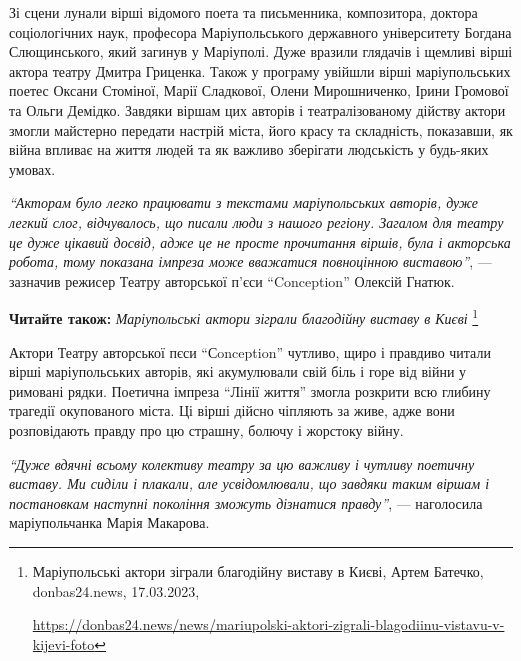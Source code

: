 Зі сцени лунали вірші відомого поета та письменника, композитора, доктора
соціологічних наук, професора Маріупольського державного університету Богдана
Слющинського, який загинув у Маріуполі. Дуже вразили глядачів і щемливі вірші
актора театру Дмитра Гриценка. Також у програму увійшли вірші маріупольських
поетес Оксани Стоміної, Марії Сладкової, Олени Мирошниченко, Ірини Громової та
Ольги Демідко. Завдяки віршам цих авторів і театралізованому дійству актори
змогли майстерно передати настрій міста, його красу та складність, показавши,
як війна впливає на життя людей та як важливо зберігати людськість у будь-яких
умовах.


\begin{leftbar}
\emph{\enquote{Акторам було легко працювати з текстами маріупольських авторів, дуже
легкий слог, відчувалось, що писали люди з нашого регіону. Загалом для
театру це дуже цікавий досвід, адже це не просте прочитання віршів,
була і акторська робота, тому показана імпреза може вважатися
повноцінною виставою}}, — зазначив режисер Театру авторської п'єси
\enquote{Conception} Олексій Гнатюк.
\end{leftbar}

\textbf{Читайте також:} \emph{Маріупольські актори зіграли благодійну виставу в Києві}%
\footnote{Маріупольські актори зіграли благодійну виставу в Києві, Артем Батечко, donbas24.news, 17.03.2023, \par%
\url{https://donbas24.news/news/mariupolski-aktori-zigrali-blagodiinu-vistavu-v-kijevi-foto}%
}


Актори Театру авторської пєси \enquote{Сonception} чутливо, щиро і правдиво читали
вірші маріупольських авторів, які акумулювали свій біль і горе від війни у
римовані рядки. Поетична імпреза \enquote{Лінії життя} змогла розкрити всю глибину
трагедії окупованого міста. Ці вірші дійсно чіпляють за живе, адже вони
розповідають правду про цю страшну, болючу і жорстоку війну.

\begin{leftbar}
\emph{\enquote{Дуже вдячні всьому колективу театру за цю важливу і чутливу поетичну
виставу. Ми сиділи і плакали, але усвідомлювали, що завдяки таким
віршам і постановкам наступні покоління зможуть дізнатися правду}}, —
наголосила маріупольчанка Марія Макарова. 
\end{leftbar}

